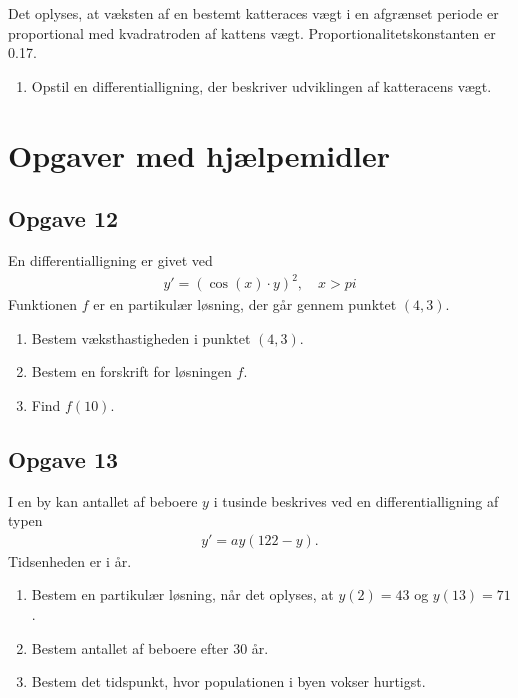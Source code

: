 Det oplyses, at væksten af en bestemt katteraces vægt i en afgrænset periode er proportional med kvadratroden af kattens vægt. Proportionalitetskonstanten er 0.17.
\begin{enumerate}[label=\roman*)]
	\item Opstil en differentialligning, der beskriver udviklingen af katteracens vægt. 
\end{enumerate}

\section*{Opgaver med hjælpemidler}

\subsection*{Opgave 12}
En differentialligning er givet ved
\begin{align*}
	y' = \left( \cos(x)\cdot y\right)^2, \quad x > pi
\end{align*}
Funktionen $f$ er en partikulær løsning, der går gennem punktet $(4,3)$.
\begin{enumerate}[label=\roman*)]
	\item Bestem væksthastigheden i punktet $(4,3)$.
	\item Bestem en forskrift for løsningen $f$. 
	\item Find $f(10)$.
\end{enumerate}

\subsection*{Opgave 13}
I en by kan antallet af beboere $y$ i tusinde beskrives ved en differentialligning af typen 
\begin{align*}
	y' = ay(122-y).
\end{align*}
Tidsenheden er i år.
\begin{enumerate}[label=\roman*)]
	\item Bestem en partikulær løsning, når det oplyses, at $y(2) = 43$ og $y(13) = 71$. 
	\item Bestem antallet af beboere efter 30 år.
	\item Bestem det tidspunkt, hvor populationen i byen vokser hurtigst. 
\end{enumerate}

